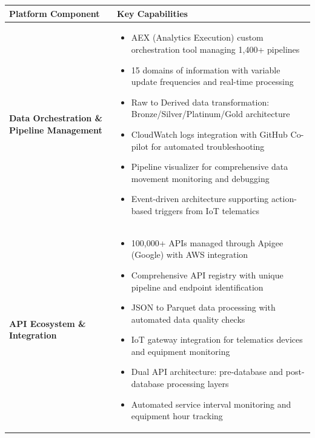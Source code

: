 \documentclass[12pt, a4paper]{article} %
\begin{document}
\begin{table}[h!]
\centering
\renewcommand{\arraystretch}{1.3}
\begin{tabularx}{\textwidth}{@{}
  >{\raggedright\arraybackslash\relax}p{2.5cm}
  X@{}}
\toprule
\textbf{Platform Component} & \textbf{Key Capabilities} \\
\midrule

\textbf{Data Orchestration \& Pipeline Management} &
\begin{itemize}[leftmargin=*, nosep]
  \item AEX (Analytics Execution) custom orchestration tool managing 1,400+ pipelines
  \item 15 domains of information with variable update frequencies and real-time processing
  \item Raw to Derived data transformation: Bronze/Silver/Platinum/Gold architecture
  \item CloudWatch logs integration with GitHub Co-pilot for automated troubleshooting
  \item Pipeline visualizer for comprehensive data movement monitoring and debugging
  \item Event-driven architecture supporting action-based triggers from IoT telematics
\end{itemize} \\

\midrule

\textbf{API Ecosystem \& Integration} &
\begin{itemize}[leftmargin=*, nosep]
  \item 100,000+ APIs managed through Apigee (Google) with AWS integration
  \item Comprehensive API registry with unique pipeline and endpoint identification
  \item JSON to Parquet data processing with automated data quality checks
  \item IoT gateway integration for telematics devices and equipment monitoring
  \item Dual API architecture: pre-database and post-database processing layers
  \item Automated service interval monitoring and equipment hour tracking
\end{itemize} \\

\midrule


\end{tabularx}
\end{table}
\end{document}

